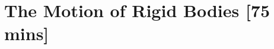 \documentclass{tufte-handout}
\begin{document}
%
%
%

\section{The Motion of Rigid Bodies [75 mins]}
\end{document}
